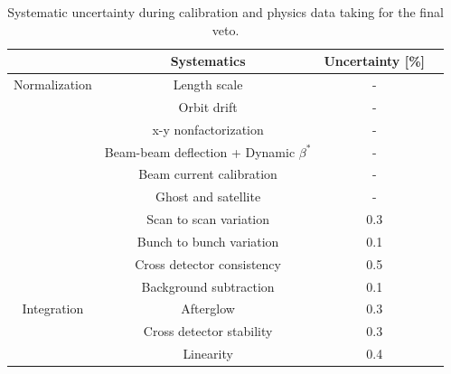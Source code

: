 \begin{table}[htbp]
  \centering
  \caption[2018 Luminosity systematic uncertainty]{Systematic uncertainty during calibration and physics data taking for the final veto.}
\label{tab:systematic-uncertainty}
\begin{tabular}{cccc}
  \textbf{}&\textbf{Systematics} &\textbf{Uncertainty [\%]} \\
\hline
Normalization  & Length scale & -  \\
 & Orbit drift &  -  \\
 & x-y nonfactorization & - \\
 & Beam-beam deflection + Dynamic $\beta^{*}$  & - \\
 & Beam current calibration  & - \\
 & Ghost and satellite & - \\
 & Scan to scan variation & 0.3 \\
 & Bunch to bunch variation & 0.1 \\
 & Cross detector consistency  & 0.5 \\
 & Background subtraction  & 0.1 \\
Integration & Afterglow  &  0.3 \\
 & Cross detector stability & 0.3 \\
 & Linearity  & 0.4 \\
\end{tabular}
\label{tab:systematic-uncertainty}
\end{table}

